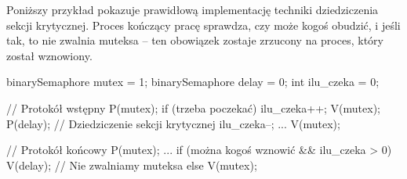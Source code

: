 \begin{example}
    Poniższy przykład pokazuje prawidłową implementację techniki dziedziczenia sekcji krytycznej. Proces kończący pracę sprawdza, czy może kogoś obudzić, i jeśli tak, to nie zwalnia muteksa -- ten obowiązek zostaje zrzucony na proces, który został wznowiony.
    \begin{java}
        binarySemaphore mutex = 1;
        binarySemaphore delay = 0;
        int ilu_czeka = 0;
        
        // Protokół wstępny
        P(mutex);
        if (trzeba poczekać) {
            ilu_czeka++;
            V(mutex);
            P(delay); // Dziedziczenie sekcji krytycznej
            ilu_czeka--;
        }
        ...
        V(mutex);
        
        // Protokół końcowy
        P(mutex);
        ...
        if (można kogoś wznowić && ilu_czeka > 0)
            V(delay); // Nie zwalniamy muteksa
        else
            V(mutex);
    \end{java}
\end{example}



